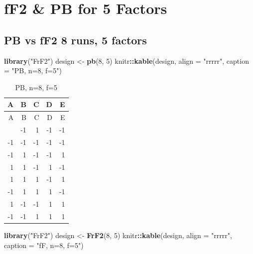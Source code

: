 \documentclass[
  12pt,
  a4paper,
]{article}
\newenvironment{Shaded}{\begin{snugshade}}{\end{snugshade}}
\newcommand{\AttributeTok}[1]{\textcolor[rgb]{0.13,0.29,0.53}{#1}}
\newcommand{\DecValTok}[1]{\textcolor[rgb]{0.00,0.00,0.81}{#1}}
\newcommand{\FunctionTok}[1]{\textcolor[rgb]{0.13,0.29,0.53}{\textbf{#1}}}
\newcommand{\NormalTok}[1]{#1}
\newcommand{\OtherTok}[1]{\textcolor[rgb]{0.56,0.35,0.01}{#1}}
\newcommand{\SpecialCharTok}[1]{\textcolor[rgb]{0.81,0.36,0.00}{\textbf{#1}}}
\newcommand{\StringTok}[1]{\textcolor[rgb]{0.31,0.60,0.02}{#1}}
\numberwithin{equation}{section}
\theoremstyle{plain}
\theoremstyle{definition}
\theoremstyle{remark}
\theoremstyle{note}
\begin{document}
\newpage

\hypertarget{ff2-pb-for-5-factors}{%
\section{fF2 \& PB for 5 Factors}\label{ff2-pb-for-5-factors}}

\hypertarget{pb-vs-ff2-8-runs-5-factors}{%
\subsection{PB vs fF2 8 runs, 5
factors}\label{pb-vs-ff2-8-runs-5-factors}}

\begin{Shaded}
\begin{Highlighting}[]
\FunctionTok{library}\NormalTok{(}\StringTok{"FrF2"}\NormalTok{)}
\NormalTok{design }\OtherTok{\textless{}{-}} \FunctionTok{pb}\NormalTok{(}\DecValTok{8}\NormalTok{, }\DecValTok{5}\NormalTok{)}
\NormalTok{knitr}\SpecialCharTok{::}\FunctionTok{kable}\NormalTok{(design, }\AttributeTok{align =} \StringTok{"rrrrr"}\NormalTok{, }\AttributeTok{caption =} \StringTok{"PB, n=8, f=5"}\NormalTok{)}
\end{Highlighting}
\end{Shaded}

\begin{longtable}[]{@{}rrrrr@{}}
\caption{PB, n=8, f=5}\tabularnewline
\toprule\noalign{}
A & B & C & D & E \\
\midrule\noalign{}
\endfirsthead
\toprule\noalign{}
A & B & C & D & E \\
\midrule\noalign{}
\endhead
\bottomrule\noalign{}
\endlastfoot
1 & -1 & 1 & -1 & -1 \\
-1 & -1 & -1 & -1 & -1 \\
-1 & 1 & -1 & -1 & 1 \\
1 & 1 & -1 & 1 & -1 \\
1 & 1 & 1 & -1 & 1 \\
-1 & 1 & 1 & 1 & -1 \\
1 & -1 & -1 & 1 & 1 \\
-1 & -1 & 1 & 1 & 1 \\
\end{longtable}

\begin{Shaded}
\begin{Highlighting}[]
\FunctionTok{library}\NormalTok{(}\StringTok{"FrF2"}\NormalTok{)}
\NormalTok{design }\OtherTok{\textless{}{-}} \FunctionTok{FrF2}\NormalTok{(}\DecValTok{8}\NormalTok{, }\DecValTok{5}\NormalTok{)}
\NormalTok{knitr}\SpecialCharTok{::}\FunctionTok{kable}\NormalTok{(design, }\AttributeTok{align =} \StringTok{"rrrrr"}\NormalTok{, }\AttributeTok{caption =} \StringTok{"fF, n=8, f=5"}\NormalTok{)}
\end{Highlighting}
\end{Shaded}
\end{document}
